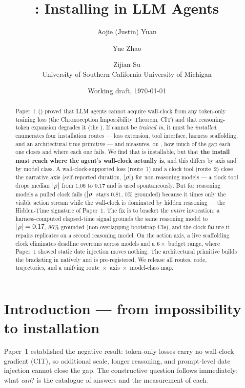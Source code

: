 \documentclass[11pt]{article}
\title{\ChronoStack: Installing \Chrono{} in LLM Agents}
\author{
    Aojie (Justin) Yuan \and Yue Zhao \and Zijian Su\\
    University of Southern California \;\textbar\; University of Michigan
}
\date{Working draft, \today}
\begin{document}
\maketitle

\begin{abstract}
Paper~1 (\emph{\Augustine}) proved that LLM agents cannot acquire wall-clock
\chrono{} from any token-only training loss (the Chronoception Impossibility
Theorem, CIT) and that reasoning-token expansion degrades it (the
\ReverseScaling). If \chrono{} cannot be \emph{trained in}, it must be
\emph{installed}. \ChronoStack{} enumerates four installation routes ---
loss extension, tool interface, harness scaffolding, and an architectural time
primitive --- and measures, on \ChronoBench, how much of the gap each one closes
and where each one fails. We find that \chrono{} is installable, but that
\textbf{the install must reach where the agent's wall-clock actually is}, and
this differs by axis and by model class. A wall-clock-supported loss (route~1)
and a clock tool (route~2) close the narrative axis (self-reported duration,
$|\rho|$) for non-reasoning models --- a clock tool drops median $|\rho|$
from $1.06$ to $0.17$ and is used spontaneously. But for reasoning models a
pulled clock fails ($|\rho|$ stays $0.81$, $0\%$ grounded) because it times
only the visible action stream while the wall-clock is dominated by hidden
reasoning --- the Hidden-Time signature of Paper~1. The fix is to bracket the
\emph{entire} invocation: a harness-computed elapsed-time signal grounds the same
reasoning model to $|\rho|=0.17$, $86\%$ grounded (non-overlapping bootstrap
CIs), and the clock failure it repairs replicates on a second reasoning model. On the action axis, a live
scaffolding clock eliminates deadline overruns across models and a $6\times$
budget range, where Paper~1 showed static date injection moves nothing. The
architectural primitive builds the bracketing in natively and is pre-registered.
We release all routes, code, trajectories, and a unifying
route~$\times$~axis~$\times$~model-class map.
\end{abstract}

\section{Introduction --- from impossibility to installation}

Paper~1 established the negative result: token-only losses carry no wall-clock
gradient (CIT), so additional scale, longer reasoning, and prompt-level date
injection cannot close the \chrono{} gap. The constructive question follows
immediately: what \emph{can}? \ChronoStack{} is the catalogue of answers and the
measurement of each.
\end{document}
